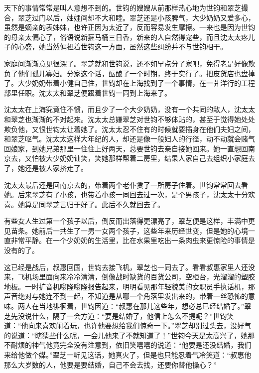 \par 天下的事情常常是叫人意想不到的。世钧的嫂嫂从前那样热心地为世钧和翠芝撮合，翠芝过门以后，妯娌间却不大和睦。翠芝还是小孩脾气，大少奶奶又爱多心，虽然是嫡亲的表姊妹，也许正因为太近了，反而容易发生摩擦。一来也是因为世钧的母亲太偏心了，俗语说新箍马桶三日香，新来的人自然得宠些，而且沈太太疼儿子的心盛，她当然偏袒着世钧这一方面，虽然这些纠纷并不与世钧相干。
\par 家庭间渐渐意见很深了。翠芝就和世钧说，还不如早点分了家吧，免得老是好像欺负了他们孤儿寡妇。分家这个话，酝酿了一个时期，终于实行了。把皮货店也盘掉了。大少奶奶带着小健自己住，世钧却在上海找到了一个事情，在一爿洋行的工程部里任职。沈太太和翠芝便跟着世钧一同到上海来了。
\par 沈太太在上海究竟住不惯，而且少了一个大少奶奶，没有一个共同的敌人，沈太太和翠芝也渐渐的不对起来。沈太太总嫌翠芝对世钧不够体贴的，甚至于觉得她处处欺负他，又恨世钧太让着她了。沈太太忍不住有的时候就要插身在他们夫妇之间，和翠芝呕气。沈太太这样大年纪的人，却还是像一般妇人的行径，动不动就会赌气回娘家，到她兄弟那里一住住上好两天，总要世钧去亲自接她回来。她一直想回南京去，又怕被大少奶奶讪笑，笑她那样帮着二房里，结果人家自己去组织小家庭去了，她还是被人家挤走了。
\par 沈太太最后还是回南京去的，带着两个老仆赁了一所房子住着。世钧常常回去看她。后来翠芝有了小孩，也带着小孩一同回去过一次，是个男孩子，沈太太十分欢喜。她算是同翠芝言归于好了。此后不久就回去了。
\par 有些女人生过第一个孩子以后，倒反而出落得更漂亮了，翠芝便是这样，丰满中更见苗条。她前后一共生了一男一女两个孩子，这些年来历经世变，但是她的心境一直非常平静。在一个少奶奶的生活里，比在水果里吃出一条肉虫来更惊险的事情是没有的了。
\par 这已经是战后，叔惠回国，世钧去接飞机，翠芝也一同去了。看看叔惠家里人还没来，飞机场里面向来冷冷清清，倒像战时缺货的百货公司，空柜台，光溜溜的塑胶地板。一时扩音机嗡隆嗡隆报告起来，明明看见那年轻貌美的女职员手执话机，那声音绝对与她连不到一起，不知道是从哪一个角落里发出来的，带着一丝恐怖的意味。两人在当地徘徊着，世钧因道：“叔惠在那儿这些年，想必总已经结婚了。”翠芝先没说什么，隔了一会方道：“要是结婚了，他信上怎么不提呢？”世钧笑道：“他向来喜欢闹着玩，也许他要想给我们惊奇一下。”翠芝却别过头去，没好气的说道：“瞎猜些什么呢，一会儿他来了不就知道了！”世钧今天是太高兴了，她那不耐烦的神气他竟完全没有注意到，依旧笑嘻嘻的说道：“他要是还没结婚，我们来给他做个媒。”翠芝一听见这话，她真火了，但是也只能忍着气冷笑道：“叔惠他那么大岁数的人，他要是要结婚，自己不会去找，还要你替他操心？”
